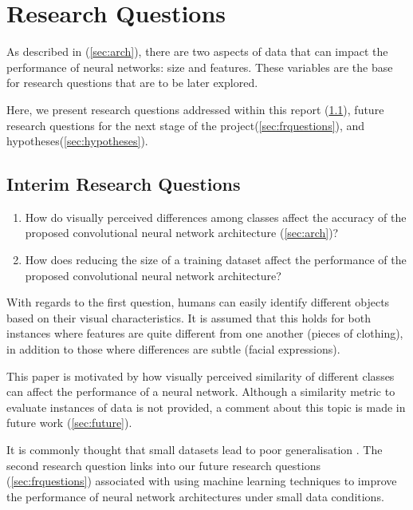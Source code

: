 \documentclass{article}
\begin{document}
\section{Research Questions}
\label{sec:questions}

As described in (\ref{sec:arch}), there are two aspects of data that can impact the performance of neural networks: size and features. These variables are the base for research questions that are to be later explored. 

Here, we present research questions addressed within this report (\ref{sec:irquestions}), future research questions for the next stage of the project(\ref{sec:frquestions}), and hypotheses(\ref{sec:hypotheses}).

\subsection{Interim Research Questions}
\label{sec:irquestions}

\begin{enumerate}
  \item How do visually perceived differences among classes affect the accuracy of the proposed convolutional neural network architecture (\ref{sec:arch})?
  \item How does reducing the size of a training dataset affect the performance of the proposed convolutional neural network architecture?
\end{enumerate}

With regards to the first question, humans can easily identify different objects based on their visual characteristics. It is assumed that this holds for both instances where features are quite different from one another (pieces of clothing), in addition to those where differences are subtle (facial expressions). 

This paper is motivated by how visually perceived similarity of different classes can affect the performance of a neural network. Although a similarity metric to evaluate instances of data is not provided, a comment about this topic is made in future work (\ref{sec:future}).

It is commonly thought that small datasets lead to poor generalisation \cite{lotsDataAndrew}. The second research question links into our future research questions (\ref{sec:frquestions}) associated with using machine learning techniques to improve the performance of neural network architectures under small data conditions.
\end{document}
